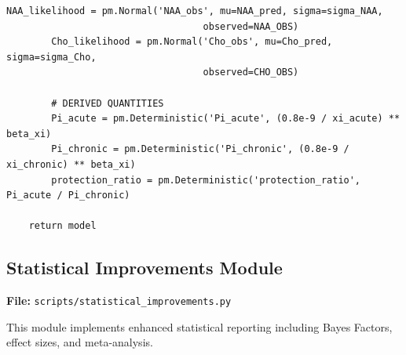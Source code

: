 \documentclass[11pt]{article}
\begin{document}
\begin{lstlisting}[caption={Enzyme Kinetics Model - PyMC Model (Lines 172--314)}]
        NAA_likelihood = pm.Normal('NAA_obs', mu=NAA_pred, sigma=sigma_NAA,
                                   observed=NAA_OBS)
        Cho_likelihood = pm.Normal('Cho_obs', mu=Cho_pred, sigma=sigma_Cho,
                                   observed=CHO_OBS)

        # DERIVED QUANTITIES
        Pi_acute = pm.Deterministic('Pi_acute', (0.8e-9 / xi_acute) ** beta_xi)
        Pi_chronic = pm.Deterministic('Pi_chronic', (0.8e-9 / xi_chronic) ** beta_xi)
        protection_ratio = pm.Deterministic('protection_ratio', Pi_acute / Pi_chronic)

    return model
\end{lstlisting}

\subsection{Statistical Improvements Module}

\textbf{File:} \texttt{scripts/statistical\_improvements.py}

This module implements enhanced statistical reporting including Bayes Factors, effect sizes, and meta-analysis.
\end{document}
